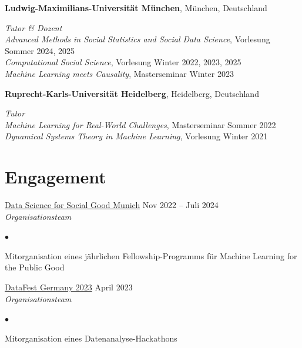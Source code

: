 \documentclass[margin,line, 10pt]{res}
\newenvironment{list2}{
	\begin{list}{$\bullet$}{%
			\setlength{\itemsep}{0in}
			\setlength{\parsep}{0in} \setlength{\parskip}{0in}
			\setlength{\topsep}{0in} \setlength{\partopsep}{0in} 
			\setlength{\leftmargin}{0.2in}}}{\end{list}}
\begin{document}
\begin{resume}
		{\bf Ludwig-Maximilians-Universit\"at M\"unchen}, M\"unchen, Deutschland
		
		\vspace{-.4cm}
		{\em Tutor \& Dozent}\\
		\textit{Advanced Methods in Social Statistics and Social Data Science}, Vorlesung \hfill Sommer 2024, 2025 \\
		\textit{Computational Social Science}, Vorlesung \hfill Winter 2022, 2023, 2025\\
		\textit{Machine Learning meets Causality}, Masterseminar \hfill Winter 2023
		
		
		
		{\bf Ruprecht-Karls-Universit\"at Heidelberg}, Heidelberg, Deutschland
		
		\vspace{-.4cm}
		{\em Tutor}\\
		\textit{Machine Learning for Real-World Challenges}, Masterseminar \hfill Sommer 2022 \\
		\textit{Dynamical Systems Theory in Machine Learning}, Vorlesung \hfill Winter 2021
		
		\section{\sc Engagement}
		
		\href{https://www.dssgxmunich.org/startseite}{Data Science for Social Good Munich} \hfill {Nov 2022 -- Juli 2024} \\
		{\em Organisationsteam}\\
		
		\begin{list2}
			\vspace*{-0.3cm}
			\item Mitorganisation eines jährlichen Fellowship-Programms für Machine Learning for the Public Good
		\end{list2}
		
		\vspace*{-2.5mm}
		\href{https://sites.google.com/view/datafest-2023/home}{DataFest Germany 2023} \hfill {April 2023}\\
		{\em Organisationsteam}\\
		\begin{list2}
			\vspace*{-0.3cm}
			\item Mitorganisation eines Datenanalyse-Hackathons
		\end{list2}
		
	\end{resume}
\end{document}
